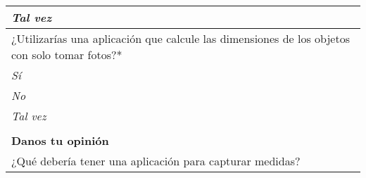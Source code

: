 \begin{center}
\begin{tabular}{|p{16cm}|}
	   \hspace{1cm}\textit{Tal vez}\\
	   \hline
	   ¿Utilizarías una aplicación que calcule las dimensiones de los objetos con solo tomar fotos?\textcolor{rojo}{*}\\
	   \hspace{1cm}\textit{Sí}\\
	   \hspace{1cm}\textit{No}\\
	   \hspace{1cm}\textit{Tal vez}\\
	   \hline
	\rowcolor[rgb]{0.8,0.8,0.8}\\
            \rowcolor[rgb]{0.8,0.8,0.8}
            \textbf{\color{darkgray}Danos tu opinión} \\ [0.3cm]
            ¿Qué debería tener una aplicación para capturar medidas?\\
            \hline
    \end{tabular}
    \end{center}
